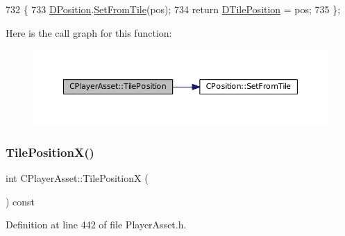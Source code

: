 \begin{DoxyCode}
732                                                         \{
733     \hyperlink{classCPlayerAsset_aa9f53c009b181c7c5647c6b03776a04c}{DPosition}.\hyperlink{classCPosition_a46994e6a8b8e3b4237edd7259ad844b6}{SetFromTile}(pos);
734     \textcolor{keywordflow}{return} \hyperlink{classCPlayerAsset_a5b59a9d3b7db8c7fa194b80dafb96186}{DTilePosition} = pos;
735 \};
\end{DoxyCode}
Here is the call graph for this function\+:\nopagebreak
\begin{figure}[H]
\begin{center}
\leavevmode
\includegraphics[width=350pt]{classCPlayerAsset_a6d84105b6db136a6846fcaf80dba3747_cgraph}
\end{center}
\end{figure}
\hypertarget{classCPlayerAsset_aeabaa8fe7161cce571b6c4d2f7180085}{}\label{classCPlayerAsset_aeabaa8fe7161cce571b6c4d2f7180085} 
\subsubsection{\texorpdfstring{Tile\+Position\+X()}{TilePositionX()}\hspace{0.1cm}{\footnotesize\ttfamily [1/2]}}
{\footnotesize\ttfamily int C\+Player\+Asset\+::\+Tile\+PositionX (\begin{DoxyParamCaption}{ }\end{DoxyParamCaption}) const\hspace{0.3cm}{\ttfamily [inline]}}



Definition at line 442 of file Player\+Asset.\+h.


